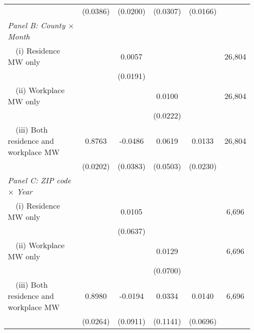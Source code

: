 \begin{landscape}
\begin{table}[ht!]
\begin{tabular}{@{}lccccc@{}}
                                                             & (0.0386) & (0.0200) & (0.0307) & (0.0166) &      \\
        \textit{Panel B: County $\times$ Month}              &       &       &       &       &      \\
        $\quad$(i) Residence MW only                         &       &  0.0057  &       &       & 26,804 \\
                                                             &       & (0.0191) &       &       &      \\
        $\quad$(ii) Workplace MW only                        &       &       &  0.0100  &       & 26,804 \\
                                                             &       &       & (0.0222) &       &      \\
        $\quad$(iii) Both residence and workplace MW         &  0.8763  &  -0.0486  &  0.0619  &  0.0133  & 26,804 \\
                                                             & (0.0202) & (0.0383) & (0.0503) & (0.0230) &      \\
        \textit{Panel C: ZIP code $\times$ Year}             &       &       &       &       &      \\
        $\quad$(i) Residence MW only                         &       &  0.0105  &       &       & 6,696 \\
                                                             &       & (0.0637) &       &       &      \\
        $\quad$(ii) Workplace MW only                        &       &       &  0.0129  &       & 6,696 \\
                                                             &       &       & (0.0700) &       &      \\
        $\quad$(iii) Both residence and workplace MW         &  0.8980  &  -0.0194  &  0.0334  &  0.0140  & 6,696 \\
                                                             & (0.0264) & (0.0911) & (0.1141) & (0.0696) &      \\ \bottomrule
    \end{tabular}
    

\end{table}
\end{landscape}
